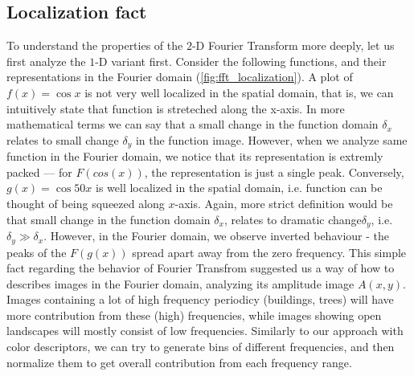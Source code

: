 \documentclass{report}
\begin{document}
\subsection{Localization fact}
To understand the properties of the $2$-D Fourier Transform more deeply, let us first analyze the $1$-D variant first. Consider the following functions, and their representations in the Fourier domain (\ref{fig:fft_localization}). A plot of $f(x)=\cos {x}$ is not very well localized in the spatial domain, that is, we can intuitively state that function is streteched along the x-axis. In more mathematical terms we can say that a small change in the function domain $\delta_x$ relates to small change $\delta_y$ in the function image.  However, when we analyze same function in the Fourier domain, we notice that its representation is extremly packed --- for $F(cos(x))$, the representation is just a single peak. Conversely, $g(x)=\cos {50x}$ is well localized in the spatial domain, i.e. function can be thought of being squeezed along $x$-axis. Again, more strict definition would be that small change in the function domain $\delta_x$, relates to dramatic change$\delta_y$, i.e. $\delta_y \gg \delta_x$. However, in the Fourier domain, we observe inverted behaviour - the peaks of the $F(g(x))$ spread apart away from the zero frequency. This simple fact regarding the behavior of Fourier Transfrom suggested us a way of how to describes images in the Fourier domain, analyzing its amplitude image $A(x,y)$. Images containing a lot of high frequency periodicy (buildings, trees) will have more contribution from these (high) frequencies, while images showing open landscapes will mostly consist of low frequencies. Similarly to our approach with color descriptors, we can try to generate bins of different frequencies, and then normalize them to get overall contribution from each frequency range.
\end{document}
